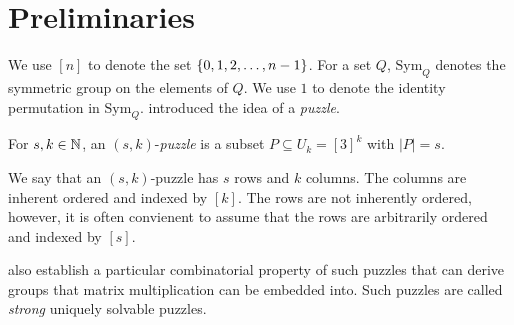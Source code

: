 \documentclass[11pt]{article}
\newcommand\sse{\subseteq}
\newcommand\Sym[1]{\ensuremath{\mathrm{Sym}_{#1}}}
\begin{document}
\section{Preliminaries}
\label{sec:prelim}

\newcommand\ordset[1]{\ensuremath{[#1]}}

We use $\ordset{n}$ to denote the set $\left\{ 0,1,2,\ldots, n-1 \right\}$.  For
a set $Q$, $\Sym{Q}$ denotes the symmetric group on the elements of
$Q$.  We use $1$ to denote the identity permutation in
$\Sym{Q}$. \cite{cksu05} introduced the idea of a \emph{puzzle}.

\begin{definition}[Puzzle]
  For $s, k \in \mathbb{N}$, an $(s,k)$-\emph{puzzle} is a
  subset $P \sse U_k = \ordset{3}^k$ with $|P| = s$.
\end{definition}

We say that an $(s,k)$-puzzle has $s$ rows and $k$ columns.  The
columns are inherent ordered and indexed by $\ordset{k}$.  The rows
are not inherently ordered, however, it is often convienent to assume
that the rows are arbitrarily ordered and indexed by $\ordset{s}$.

\cite{cksu05} also establish a particular combinatorial property of
such puzzles that can derive groups that matrix multiplication can be
embedded into.  Such puzzles are called \emph{strong} uniquely
solvable puzzles.



\end{document}
